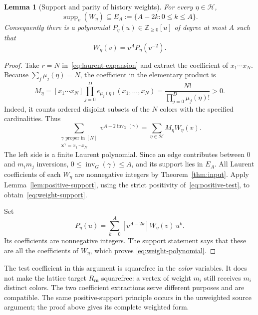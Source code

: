 \documentclass[11pt,reqno]{amsart}
\newcommand{\xx}{\mathbf x}
\newcommand{\mm}{\mathbf m}
\newcommand{\HH}{\mathcal H}
\newcommand{\inv}{\operatorname{inv}}
\newcommand{\supp}{\operatorname{supp}}
\newtheorem{lemma}[theorem]{Lemma}
\theoremstyle{definition}
\theoremstyle{remark}
\numberwithin{equation}{section}
\begin{document}
\begin{lemma}[Support and parity of history weights]\label{lem:finite}
For every $\eta\in\HH$,
\begin{equation}\label{eq:weight-support}
 \supp_v(W_\eta)\subseteq E_A:=\{A-2k:0\leq k\leq A\}.
\end{equation}
Consequently there is a polynomial $P_\eta(u)\in\mathbb Z_{\geq0}[u]$
of degree at most $A$ such that
\begin{equation}\label{eq:weight-polynomial}
 W_\eta(v)=v^A P_\eta(v^{-2}).
\end{equation}
\end{lemma}
\begin{proof}
Take $r=N$ in~\eqref{eq:laurent-expansion} and extract the coefficient
of $x_1\cdots x_N$.  Because $\sum_j\mu_j(\eta)=N$, the coefficient
in the elementary product is
\begin{equation}\label{eq:positive-test}
 M_\eta=[x_1\cdots x_N]\prod_{j=0}^D e_{\mu_j(\eta)}(x_1,\ldots,x_N)
       =\frac{N!}{\prod_{j=0}^D\mu_j(\eta)!}>0.
\end{equation}
Indeed, it counts ordered disjoint subsets of the $N$ colors with the
specified cardinalities.  Thus
\begin{equation}\label{eq:test-identity}
 \sum_{\substack{\gamma\text{ proper in }[N]\\\xx^\gamma=x_1\cdots x_N}}
       v^{A-2\inv_G(\gamma)}
   =\sum_{\eta\in\HH}M_\eta W_\eta(v).
\end{equation}
The left side is a finite Laurent polynomial.  Since an edge contributes
between $0$ and $m_i m_j$ inversions,
$0\leq\inv_G(\gamma)\leq A$, and its support lies in $E_A$.
All Laurent coefficients of each $W_\eta$ are nonnegative integers by
Theorem~\ref{thm:input}.  Apply Lemma~\ref{lem:positive-support}, using
the strict positivity of~\eqref{eq:positive-test}, to
obtain~\eqref{eq:weight-support}.

Set
\begin{equation}\label{eq:Peta}
 P_\eta(u)=\sum_{k=0}^A [v^{A-2k}]W_\eta(v)\,u^k.
\end{equation}
Its coefficients are nonnegative integers.  The support statement says
that these are all the coefficients of $W_\eta$, which proves
\eqref{eq:weight-polynomial}.
\end{proof}

The test coefficient in this argument is squarefree in the \emph{color}
variables.  It does not make the lattice target $R_{\mm}$ squarefree:
a vertex of weight $m_i$ still receives $m_i$ distinct colors.  The two
coefficient extractions serve different purposes and are compatible.
The same positive-support principle occurs in the unweighted source
argument; the proof above gives its complete weighted form.
\end{document}
